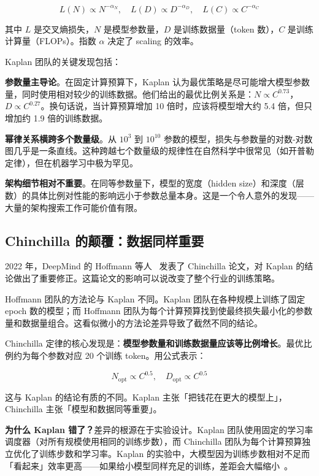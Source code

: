 \begin{equation}
  L(N) \propto N^{-\alpha_N}, \quad L(D) \propto D^{-\alpha_D}, \quad L(C) \propto C^{-\alpha_C}
\end{equation}

其中 $L$ 是交叉熵损失，$N$ 是模型参数量，$D$ 是训练数据量（token 数），$C$ 是训练计算量（FLOPs）。指数 $\alpha$ 决定了 scaling 的效率。

Kaplan 团队的关键发现包括：

\textbf{参数量主导论}。在固定计算预算下，Kaplan 认为最优策略是尽可能增大模型参数量，同时使用相对较少的训练数据。他们给出的最优比例关系是：$N \propto C^{0.73}$，$D \propto C^{0.27}$。换句话说，当计算预算增加 10 倍时，应该将模型增大约 5.4 倍，但只增加约 1.9 倍的训练数据。

\textbf{幂律关系横跨多个数量级}。从 $10^3$ 到 $10^{10}$ 参数的模型，损失与参数量的对数-对数图几乎是一条直线。这种跨越七个数量级的规律性在自然科学中很常见（如开普勒定律），但在机器学习中极为罕见。

\textbf{架构细节相对不重要}。在同等参数量下，模型的宽度（hidden size）和深度（层数）的具体比例对性能的影响远小于参数总量本身。这是一个令人意外的发现——大量的架构搜索工作可能价值有限。

\subsection{Chinchilla 的颠覆：数据同样重要}

2022 年，DeepMind 的 Hoffmann 等人~\cite{hoffmann2022chinchilla} 发表了 Chinchilla 论文，对 Kaplan 的结论做出了重要修正。这篇论文的影响可以说改变了整个行业的训练策略。

Hoffmann 团队的方法论与 Kaplan 不同。Kaplan 团队在各种规模上训练了固定 epoch 数的模型；而 Hoffmann 团队为每个计算预算找到使最终损失最小化的参数量和数据量组合。这看似微小的方法论差异导致了截然不同的结论。

Chinchilla 定律的核心发现是：\textbf{模型参数量和训练数据量应该等比例增长}。最优比例约为每个参数对应 20 个训练 token。用公式表示：

\begin{equation}
  N_{\text{opt}} \propto C^{0.5}, \quad D_{\text{opt}} \propto C^{0.5}
\end{equation}

这与 Kaplan 的结论有质的不同。Kaplan 主张「把钱花在更大的模型上」，Chinchilla 主张「模型和数据同等重要」。

\textbf{为什么 Kaplan 错了？}差异的根源在于实验设计。Kaplan 团队使用固定的学习率调度器（对所有规模使用相同的训练步数），而 Chinchilla 团队为每个计算预算独立优化了训练步数和学习率。Kaplan 的实验中，大模型因为训练步数相对不足而「看起来」效率更高——如果给小模型同样充足的训练，差距会大幅缩小~\cite{hoffmann2022chinchilla}。

